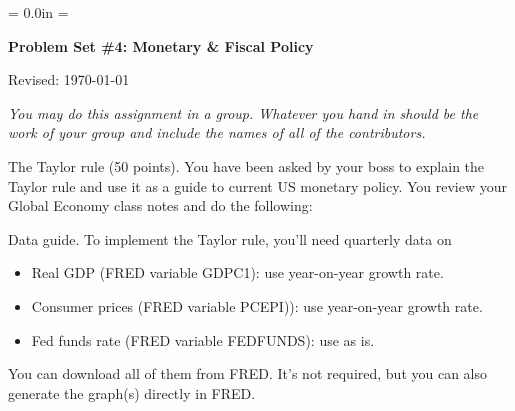 \documentclass[12pt]{exam}
\def\HeadName{Problem Set \#4}
\begin{document}
\parindent = 0.0in
\parskip = \bigskipamount
\thispagestyle{empty}%
\Head

\centerline{\large \bf \HeadName: Monetary \& Fiscal Policy}
\centerline{Revised:  \today}

\medskip
{\it You may do this assignment in a group.
Whatever you hand in should be the work of your group
and include the names of all of the contributors.}

\begin{questions}
\question The Taylor rule (50 points).
You have been asked by your boss to explain the Taylor rule
and use it as a guide to current US monetary policy.
You review your Global Economy class notes and do the following:
Data guide.  To implement the Taylor rule,
you'll need quarterly data on
\begin{itemize}
\item Real GDP (FRED variable GDPC1):  use year-on-year growth rate.
\item Consumer prices (FRED variable PCEPI)):  use year-on-year growth rate.
\item Fed funds rate (FRED variable FEDFUNDS):  use as is.
\end{itemize}
You can download all of them from FRED.
It's not required, but you can also generate the graph(s) directly in FRED.


\end{questions}
\end{document}
